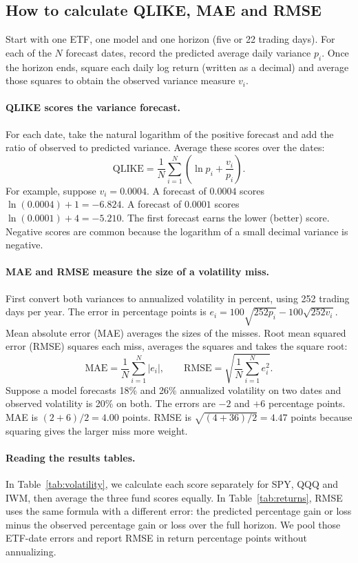\documentclass[11pt]{article}
\begin{document}
\subsection{How to calculate QLIKE, MAE and RMSE}\label{sec:forecast-errors}
Start with one ETF, one model and one horizon (five or 22 trading days). For each of the $N$ forecast dates, record the predicted average daily variance $p_i$. Once the horizon ends, square each daily log return (written as a decimal) and average those squares to obtain the observed variance measure $v_i$.

\paragraph{QLIKE scores the variance forecast.} For each date, take the natural logarithm of the positive forecast and add the ratio of observed to predicted variance. Average these scores over the dates:
\[
\mathrm{QLIKE}=\frac{1}{N}\sum_{i=1}^{N}\left(\ln p_i+\frac{v_i}{p_i}\right).
\]
For example, suppose $v_i=0.0004$. A forecast of $0.0004$ scores $\ln(0.0004)+1=-6.824$. A forecast of $0.0001$ scores $\ln(0.0001)+4=-5.210$. The first forecast earns the lower (better) score. Negative scores are common because the logarithm of a small decimal variance is negative.

\paragraph{MAE and RMSE measure the size of a volatility miss.} First convert both variances to annualized volatility in percent, using 252 trading days per year. The error in percentage points is $e_i=100\sqrt{252p_i}-100\sqrt{252v_i}$. Mean absolute error (MAE) averages the sizes of the misses. Root mean squared error (RMSE) squares each miss, averages the squares and takes the square root:
\[
\mathrm{MAE}=\frac{1}{N}\sum_{i=1}^{N}|e_i|,
\qquad
\mathrm{RMSE}=\sqrt{\frac{1}{N}\sum_{i=1}^{N}e_i^2}.
\]
Suppose a model forecasts 18\% and 26\% annualized volatility on two dates and observed volatility is 20\% on both. The errors are $-2$ and $+6$ percentage points. MAE is $(2+6)/2=4.00$ points. RMSE is $\sqrt{(4+36)/2}=4.47$ points because squaring gives the larger miss more weight.

\paragraph{Reading the results tables.} In Table~\ref{tab:volatility}, we calculate each score separately for SPY, QQQ and IWM, then average the three fund scores equally. In Table~\ref{tab:returns}, RMSE uses the same formula with a different error: the predicted percentage gain or loss minus the observed percentage gain or loss over the full horizon. We pool those ETF-date errors and report RMSE in return percentage points without annualizing.
\end{document}
